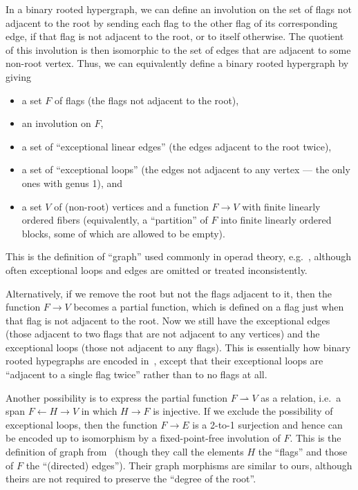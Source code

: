 \documentclass{article}
\theoremstyle{definition}
\theoremstyle{remark}
\let\ot\leftarrow
\begin{document}
In a binary rooted hypergraph, we can define an involution on the set of flags not adjacent to the root by sending each flag to the other flag of its corresponding edge, if that flag is not adjacent to the root, or to itself otherwise.
The quotient of this involution is then isomorphic to the set of edges that are adjacent to some non-root vertex.
Thus, we can equivalently define a binary rooted hypergraph by giving
\begin{itemize}
\item a set $F$ of flags (the flags not adjacent to the root),
\item an involution on $F$,
\item a set of ``exceptional linear edges'' (the edges adjacent to the root twice),
\item a set of ``exceptional loops'' (the edges not adjacent to any vertex --- the only ones with genus 1), and
\item a set $V$ of (non-root) vertices and a function $F\to V$ with finite linearly ordered fibers (equivalently, a ``partition'' of $F$ into finite linearly ordered blocks, some of which are allowed to be empty).
\end{itemize}
This is the definition of ``graph'' used commonly in operad theory, e.g.~\cite{bm:gen-opds,km:gwcqceg,costello:ainf,mms:wheeled-props,gk:modular-operads}, although often exceptional loops and edges are omitted or treated inconsistently.

Alternatively, if we remove the root but not the flags adjacent to it, then the function $F\to V$ becomes a partial function, which is defined on a flag just when that flag is not adjacent to the root.
Now we still have the exceptional edges (those adjacent to two flags that are not adjacent to any vertices) and the exceptional loops (those not adjacent to any flags).
This is essentially how binary rooted hypegraphs are encoded in~\cite{bb:htapm}, except that their exceptional loops are ``adjacent to a single flag twice'' rather than to no flags at all.

Another possibility is to express the partial function $F\rightharpoonup V$ as a relation, i.e.\ a span $F \ot H \to V$ in which $H\to F$ is injective.
If we exclude the possibility of exceptional loops, then the function $F\to E$ is a 2-to-1 surjection and hence can be encoded up to isomorphism by a fixed-point-free involution of $F$.
This is the definition of graph from~\cite{jk:feynman} (though they call the elements $H$ the ``flags'' and those of $F$ the ``(directed) edges'').
Their graph morphisms are similar to ours, although theirs are not required to preserve the ``degree of the root''.
\end{document}
